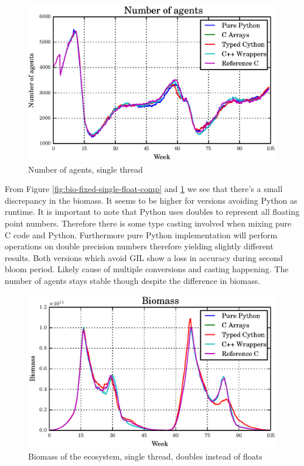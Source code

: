 \documentclass[12pt, a4paper]{report}
\begin{document}
\begin{appendices}
\begin{figure}[H]
  \begin{center}
    \includegraphics[width=\columnwidth]{graphs/ag-fixed-single-float-comp.eps}
    \caption{Number of agents, single thread}
    \label{fig:ag-fixed-single-float-comp}
  \end{center}
\end{figure}

From Figure \ref{fig:bio-fixed-single-float-comp} and \ref{fig:ag-fixed-single-float-comp}
we see that there's a small discrepancy in the biomass. It seems to be higher for versions
avoiding Python as runtime. It is important to note that Python uses doubles to represent
all floating point numbers. Therefore there is some type casting involved when mixing
pure C code and Python. Furthermore pure Python implementation will perform operations
on double precision numbers therefore yielding slightly different results. Both versions
which avoid GIL show a loss in accuracy during second bloom period. Likely cause of
multiple conversions and casting happening. The number of agents stays stable though
despite the difference in biomass.

\begin{figure}[H]
  \begin{center}
    \includegraphics[width=\columnwidth]{graphs/bio-fixed-single-double-comp.eps}
    \caption{Biomass of the ecosystem, single thread, doubles instead of floats}
    \label{fig:bio-fixed-single-double-comp}
  \end{center}
\end{figure}


\end{appendices}
\end{document}

